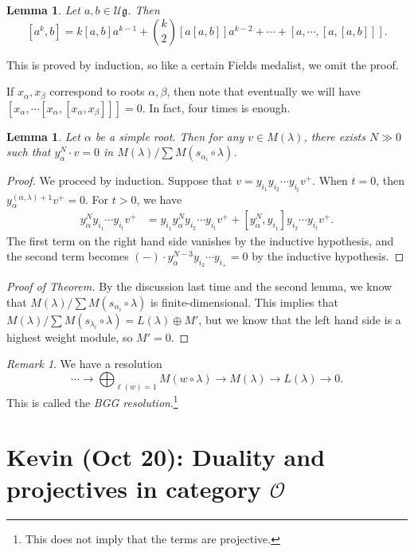 \documentclass[leqno, openany]{memoir}
\newtheorem{lem}[thm]{Lemma}
\theoremstyle{definition}
\theoremstyle{remark}
\newtheorem{rmk}[thm]{Remark}
\theoremstyle{plain}
\theoremstyle{definition}
\theoremstyle{remark}
\newcommand{\U}{\mathcal{U}}
\newcommand{\cO}{\mathcal{O}}
\newcommand{\g}{\mathfrak{g}}
\begin{document}
\begin{lem}
    Let $a, b \in \U \g$. Then 
    \[ [a^k, b] = k [a,b] a^{k-1} + \binom{k}{2} [a[a,b]] a^{k-2} + \cdots + [a, \cdots, [a,[a,b]]]. \]
\end{lem}
This is proved by induction, so like a certain Fields medalist, we omit the proof.

If $x_{\alpha}, x_{\beta}$ correspond to roots $\alpha, \beta$, then note that eventually we will have $[x_{\alpha}, \cdots [x_{\alpha}, [x_{\alpha}, x_{\beta}]]] = 0$. In fact, four times is enough. 

\begin{lem}
    Let $\alpha$ be a simple root. Then for any $v \in M(\lambda)$, there exists $N \gg 0$ such that $y_{\alpha}^N \cdot v = 0$ in $M(\lambda) / \sum M(s_{\alpha_i} \circ \lambda)$.
\end{lem}

\begin{proof}
    We proceed by induction. Suppose that $v = y_{i_1} y_{i_2} \cdots y_{i_t} v^+$. When $t = 0$, then $y_{\alpha}^{(\alpha, \lambda) + 1} v^+ = 0$. For $t > 0$, we have
    \begin{align*}
        y_{\alpha}^N y_{i_1} \cdots y_{i_t} v^+ &= y_{i_1} y_{\alpha}^N y_{i_2} \cdots y_{i_t} v^+ + [y_{\alpha}^N, y_{i_1}] y_{i_2} \cdots y_{i_t} v^+.
    \end{align*}
    The first term on the right hand side vanishes by the inductive hypothesis, and the second term becomes $(-) \cdot y_{\alpha}^{N-3} y_{i_2} \cdots y_{i_+} = 0$ by the inductive hypothesis.
\end{proof}

\begin{proof}[Proof of Theorem]
    By the discussion last time and the second lemma, we know that $M(\lambda) / \sum M(s_{\alpha_i} \circ \lambda)$ is finite-dimensional. This implies that $M(\lambda) / \sum M(s_{\lambda_i} \circ \lambda) = L(\lambda) \oplus M'$, but we know that the left hand side is a highest weight module, so $M' = 0$.
\end{proof}

\begin{rmk}
    We have a resolution
    \[ \cdots \to \bigoplus_{\ell(w) = 1} M(w \circ \lambda) \to M(\lambda) \to L(\lambda) \to 0. \]
    This is called the \textit{BGG resolution}.\footnote{This does not imply that the terms are projective.}
\end{rmk}

\chapter{Kevin (Oct 20): Duality and projectives in category $\cO$}%
\label{cha:kevin_oct_20_duality_and_projectives_in_category_co_}
\end{document}
